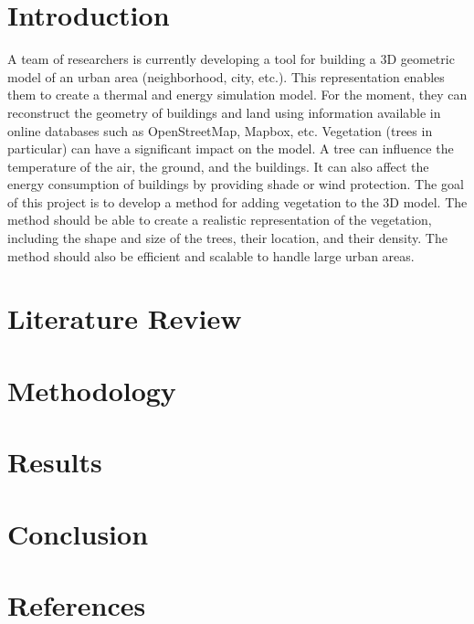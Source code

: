 \documentclass[12pt]{article}
\begin{document}
\section{Introduction}
A team of researchers is currently developing a tool for building
a 3D geometric model of an urban area (neighborhood, city, etc.).
This representation enables them to create
a thermal and energy simulation model.
For the moment, they can reconstruct the geometry of buildings and land
using information available in online databases such as OpenStreetMap, Mapbox, etc.
Vegetation (trees in particular) can have a significant impact on the model.
A tree can influence the temperature of the air, the ground, and the buildings.
It can also affect the energy consumption of buildings by providing shade or wind protection.
The goal of this project is to develop a method for adding vegetation to the 3D model.
The method should be able to create a realistic representation of the vegetation,
including the shape and size of the trees, their location, and their density.
The method should also be efficient and scalable to handle large urban areas.


\section{Literature Review}

\section{Methodology}

\section{Results}

\section{Conclusion}

\section{References}
\nocite{*}


\end{document}
